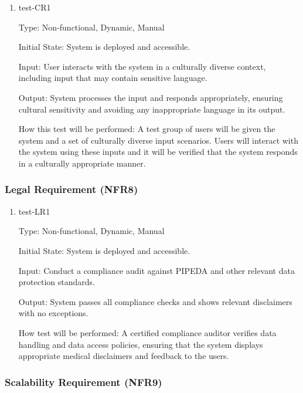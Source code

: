 \documentclass[12pt, titlepage]{article}
\begin{document}
\begin{enumerate}
  \item{test-CR1} \label{test-CR1}
  
  Type: Non-functional, Dynamic, Manual
  
  Initial State: System is deployed and accessible.
  
  Input: User interacts with the system in a culturally diverse context, including input that may contain sensitive language.
  
  Output: System processes the input and responds appropriately, ensuring cultural sensitivity and avoiding any inappropriate language in its output.
  
  How this test will be performed: A test group of users will be given the system and a set of culturally diverse input scenarios. Users will interact with the system using these inputs and it will be verified that the system responds in a culturally appropriate manner.
\end{enumerate}

\subsubsection{Legal Requirement (NFR8)} \label{section:4.2.8}

\begin{enumerate}
    \item{test-LR1} \label{test-LR1}
    
    Type: Non-functional, Dynamic, Manual
    
    Initial State: System is deployed and accessible.
    
    Input: Conduct a compliance audit against PIPEDA and other relevant data protection standards.
    
    Output: System passes all compliance checks and shows relevant disclaimers with no exceptions.
    
    How test will be performed: A certified compliance auditor verifies data handling and data access policies, ensuring that the system displays appropriate medical disclaimers and feedback to the users.
\end{enumerate}

\subsubsection{Scalability Requirement (NFR9)} \label{section:4.2.9}
\end{document}
